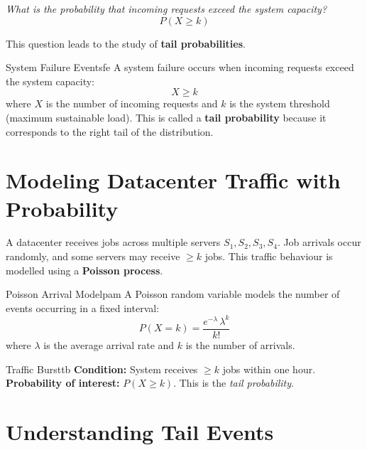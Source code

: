 \documentclass[12pt, a4paper]{article}
\begin{document}
\begin{tcolorbox}[colback=lightgray, colframe=accentblue, title=Core Question]
  \textit{What is the probability that incoming requests exceed the system capacity?}
  \[
    P(X \geq k)
  \]
\end{tcolorbox}

This question leads to the study of \textbf{tail probabilities}.

\begin{defn}{System Failure Event}{sfe}
  A system failure occurs when incoming requests exceed the system capacity:
  \[
    X \geq k
  \]
  where $X$ is the number of incoming requests and $k$ is the system threshold
  (maximum sustainable load). This is called a \textbf{tail probability} because
  it corresponds to the right tail of the distribution.
\end{defn}

\section{Modeling Datacenter Traffic with Probability}

A datacenter receives jobs across multiple servers $S_1, S_2, S_3, S_4$. Job arrivals
occur randomly, and some servers may receive $\geq k$ jobs. This traffic behaviour is
modelled using a \textbf{Poisson process}.

\begin{defn}{Poisson Arrival Model}{pam}
  A Poisson random variable models the number of events occurring in a fixed interval:
  \[
    P(X = k) = \frac{e^{-\lambda}\,\lambda^{k}}{k!}
  \]
  where $\lambda$ is the average arrival rate and $k$ is the number of arrivals.
\end{defn}

\begin{exmp}{Traffic Burst}{tb}
  \textbf{Condition:} System receives $\geq k$ jobs within one hour.\\
  \textbf{Probability of interest:} $P(X \geq k)$. This is the \emph{tail probability}.
\end{exmp}

\section{Understanding Tail Events}
\end{document}
